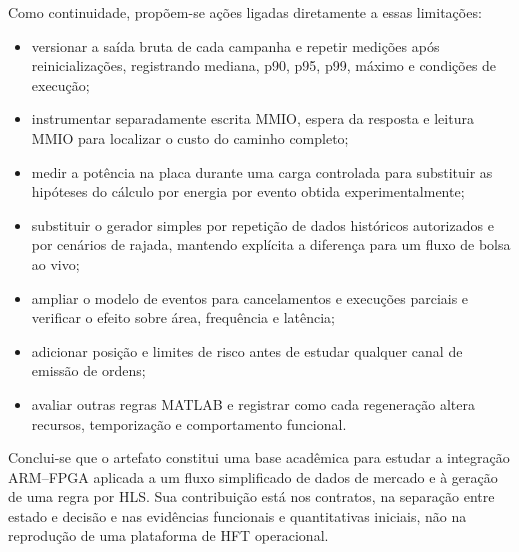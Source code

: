 Como continuidade, propõem-se ações ligadas diretamente a essas limitações:

\begin{itemize}
  \item versionar a saída bruta de cada campanha e repetir medições após reinicializações, registrando mediana, p90, p95, p99, máximo e condições de execução;
  \item instrumentar separadamente escrita MMIO, espera da resposta e leitura MMIO para localizar o custo do caminho completo;
  \item medir a potência na placa durante uma carga controlada para substituir as hipóteses do cálculo por energia por evento obtida experimentalmente;
  \item substituir o gerador simples por repetição de dados históricos autorizados e por cenários de rajada, mantendo explícita a diferença para um fluxo de bolsa ao vivo;
  \item ampliar o modelo de eventos para cancelamentos e execuções parciais e verificar o efeito sobre área, frequência e latência;
  \item adicionar posição e limites de risco antes de estudar qualquer canal de emissão de ordens;
  \item avaliar outras regras MATLAB e registrar como cada regeneração altera recursos, temporização e comportamento funcional.
\end{itemize}

Conclui-se que o artefato constitui uma base acadêmica para estudar a integração ARM--FPGA aplicada a um fluxo simplificado de dados de mercado e à geração de uma regra por HLS. Sua contribuição está nos contratos, na separação entre estado e decisão e nas evidências funcionais e quantitativas iniciais, não na reprodução de uma plataforma de HFT operacional.
